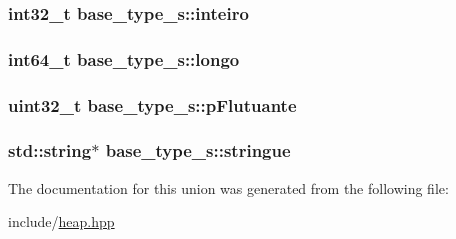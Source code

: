 \hypertarget{unionbase__type__s_aa8aa0d18e53aaef1b14d4c87779938ba}{
\subsubsection[{inteiro}]{\setlength{\rightskip}{0pt plus 5cm}int32\+\_\+t base\+\_\+type\+\_\+s\+::inteiro}}\label{unionbase__type__s_aa8aa0d18e53aaef1b14d4c87779938ba}
\hypertarget{unionbase__type__s_a1bcfa1e04911f2503e87dacad3d9fe21}{
\subsubsection[{longo}]{\setlength{\rightskip}{0pt plus 5cm}int64\+\_\+t base\+\_\+type\+\_\+s\+::longo}}\label{unionbase__type__s_a1bcfa1e04911f2503e87dacad3d9fe21}
\hypertarget{unionbase__type__s_af0cda73dbc4e18d638ae083e0e19ea7e}{
\subsubsection[{p\+Flutuante}]{\setlength{\rightskip}{0pt plus 5cm}uint32\+\_\+t base\+\_\+type\+\_\+s\+::p\+Flutuante}}\label{unionbase__type__s_af0cda73dbc4e18d638ae083e0e19ea7e}
\hypertarget{unionbase__type__s_ab246b2b35057f95ce992e7083086bae5}{
\subsubsection[{stringue}]{\setlength{\rightskip}{0pt plus 5cm}std\+::string$\ast$ base\+\_\+type\+\_\+s\+::stringue}}\label{unionbase__type__s_ab246b2b35057f95ce992e7083086bae5}


The documentation for this union was generated from the following file\+:\begin{DoxyCompactItemize}
\item 
include/\hyperlink{heap_8hpp}{heap.\+hpp}\end{DoxyCompactItemize}
